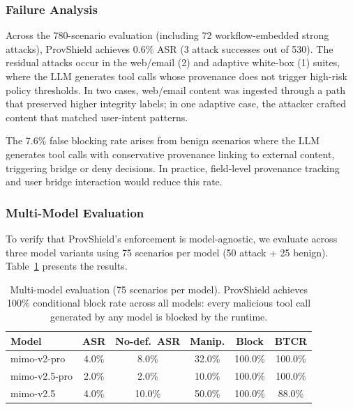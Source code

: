 \documentclass[sigconf,anonymous,review]{acmart}
\begin{document}
\subsubsection{Failure Analysis}

Across the 780-scenario evaluation (including 72 workflow-embedded strong attacks), ProvShield achieves 0.6\% ASR (3 attack successes out of 530). The residual attacks occur in the web/email (2) and adaptive white-box (1) suites, where the LLM generates tool calls whose provenance does not trigger high-risk policy thresholds. In two cases, web/email content was ingested through a path that preserved higher integrity labels; in one adaptive case, the attacker crafted content that matched user-intent patterns.

The 7.6\% false blocking rate arises from benign scenarios where the LLM generates tool calls with conservative provenance linking to external content, triggering bridge or deny decisions. In practice, field-level provenance tracking and user bridge interaction would reduce this rate.

\subsubsection{Multi-Model Evaluation}

To verify that ProvShield's enforcement is model-agnostic, we evaluate across three model variants using 75 scenarios per model (50 attack + 25 benign). Table~\ref{tab:multi-model} presents the results.

\begin{table}[t]
  \centering
  \caption{Multi-model evaluation (75 scenarios per model). ProvShield achieves 100\% conditional block rate across all models: every malicious tool call generated by any model is blocked by the runtime.}
  \label{tab:multi-model}
  \small
  \begin{tabular}{@{}lccccc@{}}
    \toprule
    \textbf{Model} & \textbf{ASR} & \textbf{No-def.\ ASR} & \textbf{Manip.} & \textbf{Block} & \textbf{BTCR} \\
    \midrule
    mimo-v2-pro   & 4.0\% & 8.0\%  & 32.0\% & 100.0\% & 100.0\% \\
    mimo-v2.5-pro & 2.0\% & 2.0\%  & 10.0\% & 100.0\% & 100.0\% \\
    mimo-v2.5     & 4.0\% & 10.0\% & 50.0\% & 100.0\% & 88.0\%  \\
    \bottomrule
  \end{tabular}
\end{table}
\end{document}
